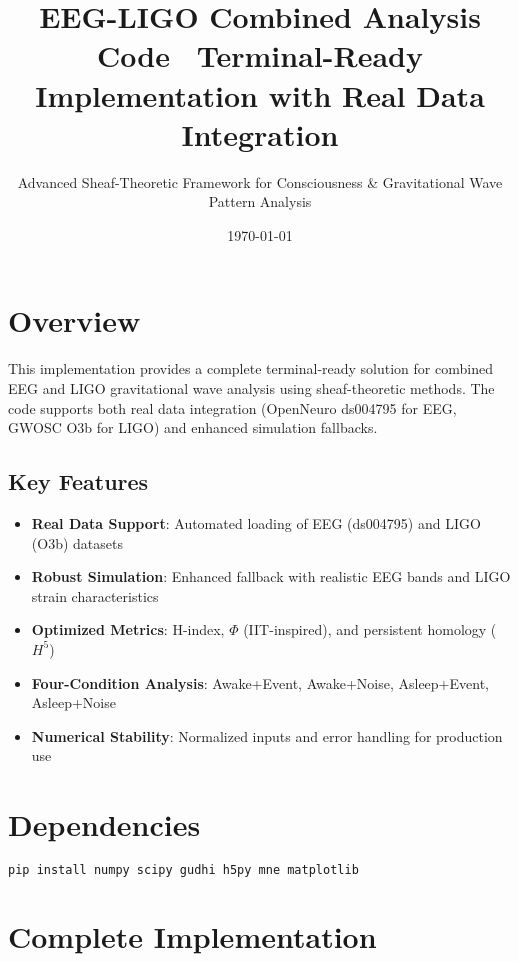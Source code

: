 \documentclass[11pt]{article}
\title{\textbf{EEG-LIGO Combined Analysis Code} \
\large Terminal-Ready Implementation with Real Data Integration}
\author{Advanced Sheaf-Theoretic Framework for Consciousness & Gravitational Wave Pattern Analysis}
\date{\today}
\begin{document}
\maketitle

\section{Overview}

This implementation provides a complete terminal-ready solution for combined EEG and LIGO gravitational wave analysis using sheaf-theoretic methods. The code supports both real data integration (OpenNeuro ds004795 for EEG, GWOSC O3b for LIGO) and enhanced simulation fallbacks.

\subsection{Key Features}
\begin{itemize}
\item \textbf{Real Data Support}: Automated loading of EEG (ds004795) and LIGO (O3b) datasets
\item \textbf{Robust Simulation}: Enhanced fallback with realistic EEG bands and LIGO strain characteristics
\item \textbf{Optimized Metrics}: H-index, $\Phi$ (IIT-inspired), and persistent homology ($H^5$)
\item \textbf{Four-Condition Analysis}: Awake+Event, Awake+Noise, Asleep+Event, Asleep+Noise
\item \textbf{Numerical Stability}: Normalized inputs and error handling for production use
\end{itemize}

\section{Dependencies}

\begin{lstlisting}[language=bash, caption={Required packages for terminal installation}]
pip install numpy scipy gudhi h5py mne matplotlib
\end{lstlisting}

\section{Complete Implementation}
\end{document}
